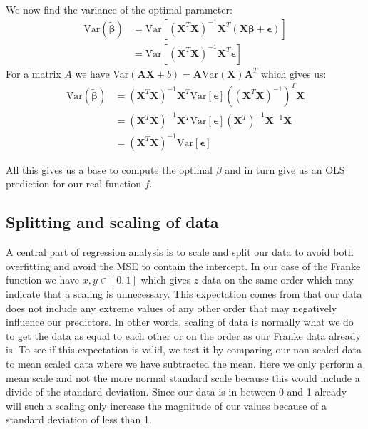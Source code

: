 \documentclass[12pt]{article}
\begin{document}
We now find the variance of the optimal parameter:
\begin{align*}
  \text{Var}(\boldsymbol{\tilde{\beta}}) &= \text{Var}[(\boldsymbol{X}^T\boldsymbol{X})^{-1} \boldsymbol{X}^T(\boldsymbol{X}\boldsymbol{\beta} + \boldsymbol {\epsilon} )] \\
  &= \text{Var}[(\boldsymbol{X}^T\boldsymbol{X})^{-1} \boldsymbol{X}^T\boldsymbol {\epsilon} ]
\end{align*}
For a matrix $A$ we have Var$(\boldsymbol{AX}+b) = \boldsymbol{A}\text{Var}(\boldsymbol{X})\boldsymbol{A}^T$ which gives us:
\begin{align*}
  \text{Var}(\boldsymbol{\tilde{\beta}})&=(\boldsymbol{X}^T\boldsymbol{X})^{-1}\boldsymbol{X}^T\text{Var}[ {\boldsymbol{\epsilon}} ]((\boldsymbol{X}^T\boldsymbol{X})^{-1})^T\boldsymbol{X} \\  &=
  (\boldsymbol{X}^T\boldsymbol{X})^{-1}\boldsymbol{X}^T\text{Var}[ {\boldsymbol{\epsilon}} ](\boldsymbol{X}^T)^{-1}\boldsymbol{X}^{-1}\boldsymbol{X} \\&=
   (\boldsymbol{X}^T\boldsymbol{X})^{-1}\text{Var}[ {\boldsymbol{\epsilon}} ]
\end{align*}

All this gives us a base to compute the optimal $\beta$ and in turn give us an OLS prediction for our real function $f$.

\subsection{Splitting and scaling of data}
A central part of regression analysis is to scale and split our data to avoid both overfitting and avoid the MSE to contain the intercept. In our case of the Franke function we have $x,y \in [0,1]$ which gives $z$ data on the same order which may indicate that a scaling is unnecessary. This expectation comes from that our data does not include any extreme values of any other order  that may negatively influence our predictors. In other words, scaling of data is normally what we do to get the data as equal to each other or on the order as our Franke data already is. To see if this expectation is valid, we test it by comparing our non-scaled data to mean scaled data where we have subtracted the mean. Here we only perform a mean scale and not the more normal standard scale because this would include a divide of the standard deviation. Since our data is in between 0 and 1 already will such a scaling only increase the magnitude of our values because of a standard deviation of less than 1.
\end{document}
